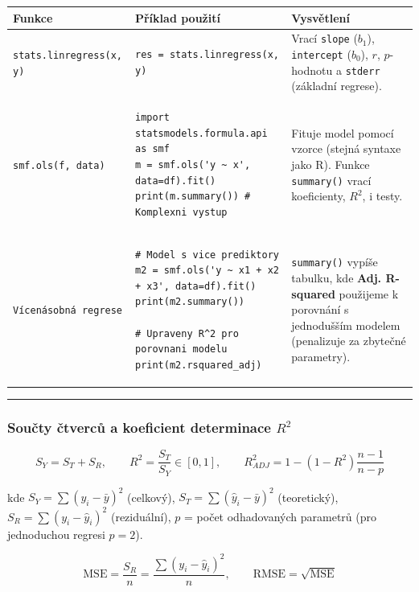 \documentclass[a4paper, 11pt]{article}
\newenvironment{funkcedict}
{%
  \begingroup
  \renewcommand{\arraystretch}{1.4}%
  \lstset{basicstyle=\ttfamily\small, columns=fullflexible}%
  \setlength{\tabcolsep}{4pt}%
  \begin{tabular}{p{0.19\textwidth} p{0.38\textwidth} p{0.30\textwidth}}
  \textbf{Funkce} & \textbf{Příklad použití} & \textbf{Vysvětlení} \\
  \midrule
}
{%
  \end{tabular}%
  \endgroup
}
\begin{document}
\begin{funkcedict}

	\texttt{stats.linregress(x, y)} &
	\begin{lstlisting}
res = stats.linregress(x, y)
	\end{lstlisting}
	& Vrací \texttt{slope} ($b_1$), \texttt{intercept} ($b_0$), $r$, $p$-hodnotu a \texttt{stderr} (základní regrese). \\

	\texttt{smf.ols(f, data)} &
	\begin{lstlisting}
import statsmodels.formula.api as smf
m = smf.ols('y ~ x', data=df).fit()
print(m.summary()) # Komplexni vystup
	\end{lstlisting}
	& Fituje model pomocí vzorce (stejná syntaxe jako R). Funkce \texttt{summary()} vrací koeficienty, $R^2$, i testy. \\

	\texttt{Vícenásobná regrese} &
	\begin{lstlisting}
# Model s vice prediktory
m2 = smf.ols('y ~ x1 + x2 + x3', data=df).fit()
print(m2.summary())

# Upraveny R^2 pro porovnani modelu
print(m2.rsquared_adj)
	\end{lstlisting}
	& \texttt{summary()} vypíše tabulku, kde \textbf{Adj. R-squared} použijeme k porovnání s jednodušším modelem (penalizuje za zbytečné parametry). \\

\end{funkcedict}
\noindent\hrule\medskip

\subsubsection{Součty čtverců a koeficient determinace $R^2$}

\begin{equation*}
	S_Y = S_T + S_R, \qquad R^2 = \frac{S_T}{S_Y} \in [0,1], \qquad
	R^2_{ADJ} = 1 - (1-R^2)\frac{n-1}{n-p}
\end{equation*}

kde $S_Y = \sum(y_i-\bar{y})^2$ (celkový), $S_T = \sum(\hat{y}_i-\bar{y})^2$ (teoretický), $S_R = \sum(y_i - \hat{y}_i)^2$ (reziduální), $p$ = počet odhadovaných parametrů (pro jednoduchou regresi $p=2$).

\begin{equation*}
	\mathrm{MSE} = \frac{S_R}{n} = \frac{\sum(y_i-\hat{y}_i)^2}{n},
	\qquad
	\mathrm{RMSE} = \sqrt{\mathrm{MSE}}
\end{equation*}
\end{document}
